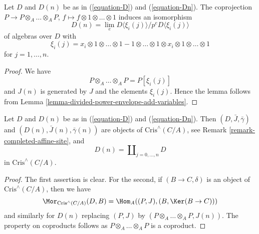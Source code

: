 \begin{lemma}
\label{lemma-structure-Dn}
Let $D$ and $D(n)$ be as in (\ref{equation-D}) and (\ref{equation-Dn}).
The coprojection $P \to P \otimes_A \ldots \otimes_A P$,
$f \mapsto f \otimes 1 \otimes \ldots \otimes 1$
induces an isomorphism
\begin{equation}
\label{equation-structure-Dn}
D(n) = \lim_e D\langle \xi_i(j) \rangle/p^eD\langle \xi_i(j) \rangle
\end{equation}
of algebras over $D$ with
$$
\xi_i(j) = x_i \otimes 1 \otimes \ldots \otimes 1 -
1 \otimes \ldots \otimes 1 \otimes x_i \otimes 1 \otimes \ldots \otimes 1
$$
for $j = 1, \ldots, n$.
\end{lemma}

\begin{proof}
We have
$$
P \otimes_A \ldots \otimes_A P = P[\xi_i(j)]
$$
and $J(n)$ is generated by $J$ and the elements $\xi_i(j)$.
Hence the lemma follows from
Lemma \ref{lemma-divided-power-envelope-add-variables}.
\end{proof}

\begin{lemma}
\label{lemma-property-Dn}
Let $D$ and $D(n)$ be as in (\ref{equation-D}) and (\ref{equation-Dn}).
Then $(D, \bar J, \bar\gamma)$ and $(D(n), \bar J(n), \bar\gamma(n))$
are objects of $\text{Cris}^\wedge(C/A)$, see
Remark \ref{remark-completed-affine-site}, and
$$
D(n) = \coprod\nolimits_{j = 0, \ldots, n} D
$$
in $\text{Cris}^\wedge(C/A)$.
\end{lemma}

\begin{proof}
The first assertion is clear. For the second, if $(B \to C, \delta)$ is an
object of $\text{Cris}^\wedge(C/A)$, then we have
$$
\Mor_{\text{Cris}^\wedge(C/A)}(D, B) = 
\Hom_A((P, J), (B, \Ker(B \to C)))
$$
and similarly for $D(n)$ replacing $(P, J)$ by
$(P \otimes_A \ldots \otimes_A P, J(n))$. The property on coproducts follows
as $P \otimes_A \ldots \otimes_A P$ is a coproduct.
\end{proof}

